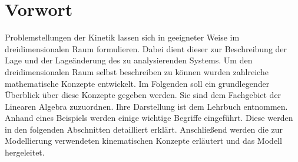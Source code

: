\chapter{Vorwort}
Problemstellungen der Kinetik lassen sich in geeigneter Weise im dreidimensionalen Raum formulieren. Dabei dient dieser zur Beschreibung der Lage und der Lage\"anderung des zu analysierenden Systems. \newline
Um den dreidimensionalen Raum selbst beschreiben zu k\"onnen wurden zahlreiche mathematische Konzepte entwickelt. Im Folgenden soll ein grundlegender \"Uberblick \"uber diese Konzepte gegeben werden. Sie sind dem Fachgebiet der Linearen Algebra zuzuordnen. Ihre Darstellung ist dem Lehrbuch \cite{Bosch2014} entnommen. Anhand eines Beispiels werden einige wichtige Begriffe eingef\"uhrt. Diese werden in den folgenden Abschnitten detailliert erkl\"art. Anschlie\ss{}end werden die zur Modellierung verwendeten kinematischen Konzepte erl\"autert und das Modell hergeleitet.
